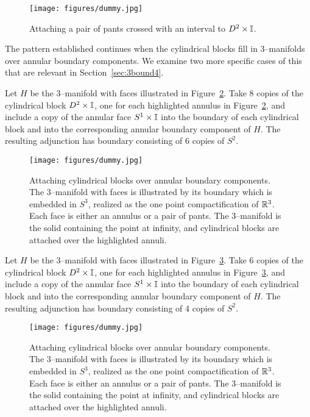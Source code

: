 \begin{figure}[H]
	\centering
	\caption{Attaching a pair of pants crossed with an interval to $D^2\times\mathbb{I}$.}
	\texttt{[image: figures/dummy.jpg]}
	\label{fig:PxIuDxI}
\end{figure}

The pattern established continues when the cylindrical blocks fill in 3--manifolds over annular boundary components.
We examine two more specific cases of this that are relevant in Section~\ref{sec:3bound4}.

\begin{ex}
	\label{ex:interactivefiber1uDxI}
	Let $H$ be the 3--manifold with faces illustrated in Figure~\ref{fig:interactivefiber1uDxI}.
	Take 8 copies of the cylindrical block $D^2\times\mathbb{I}$, one for each highlighted annulus in Figure~\ref{fig:interactivefiber1uDxI}, and include a copy of the annular face $S^1\times\mathbb{I}$ into the boundary of each cylindrical block and into the corresponding annular boundary component of $H$.
	The resulting adjunction has boundary consisting of 6 copies of $S^2$.
\end{ex}

\begin{figure}[H]
	\centering
	\caption{Attaching cylindrical blocks over annular boundary components.
	The 3--manifold with faces is illustrated by its boundary which is embedded in $S^3$, realized as the one point compactification of $ \mathbb{R}^3 $.
	Each face is either an annulus or a pair of pants.
	The 3--manifold is the solid containing the point at infinity, and cylindrical blocks are attached over the highlighted annuli.}
	\texttt{[image: figures/dummy.jpg]}
	\label{fig:interactivefiber1uDxI}
\end{figure}

\begin{ex}
	\label{ex:interactivefiber2uDxI}
	Let $H$ be the 3--manifold with faces illustrated in Figure~\ref{fig:interactivefiber2uDxI}.
	Take 6 copies of the cylindrical block $D^2\times\mathbb{I}$, one for each highlighted annulus in Figure~\ref{fig:interactivefiber2uDxI}, and include a copy of the annular face $S^1\times\mathbb{I}$ into the boundary of each cylindrical block and into the corresponding annular boundary component of $H$.
	The resulting adjunction has boundary consisting of 4 copies of $S^2$.
\end{ex}

\begin{figure}[H]
	\centering
	\caption{Attaching cylindrical blocks over annular boundary components.
		The 3--manifold with faces is illustrated by its boundary which is embedded in $S^3$, realized as the one point compactification of $ \mathbb{R}^3 $.
		Each face is either an annulus or a pair of pants.
		The 3--manifold is the solid containing the point at infinity, and cylindrical blocks are attached over the highlighted annuli.}
	\texttt{[image: figures/dummy.jpg]}
	\label{fig:interactivefiber2uDxI}
\end{figure}

